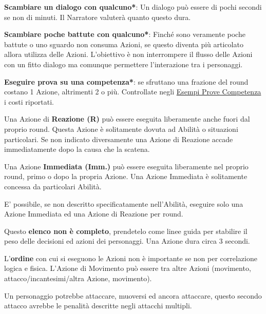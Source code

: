 \begin{multicols}{2}
\textbf{Scambiare un dialogo con qualcuno*}: Un dialogo può essere di pochi secondi se non di minuti. Il Narratore valuterà quanto questo dura.

\textbf{Scambiare poche battute con qualcuno*}: Finché sono veramente poche battute o uno sguardo non consuma Azioni, se questo diventa più articolato allora utilizza delle Azioni. L'obiettivo è non interrompere il flusso delle Azioni con un fitto dialogo ma comunque permettere l'interazione tra i personaggi.

\textbf{Eseguire prova su una competenza*}: se sfruttano una frazione del round costano 1 Azione, altrimenti 2 o più. Controllate negli \hyperlink{esempiprovecompetenze}{Esempi Prove Competenza} i costi riportati.

Una Azione di \textbf{Reazione (R)} può essere eseguita liberamente anche fuori dal proprio round. Questa Azione è solitamente dovuta ad Abilità o situazioni particolari. Se non indicato diversamente una Azione di Reazione accade immediatamente dopo la causa che la scatena.

Una Azione \textbf{Immediata (Imm.)} può essere eseguita liberamente nel proprio round, primo o dopo la propria Azione. Una Azione Immediata è solitamente concessa da particolari Abilità.

E' possibile, se non descritto specificatamente nell'Abilità, eseguire solo una Azione Immediata ed una Azione di Reazione per round.

\smallskip

Questo \textbf{elenco non è completo}, prendetelo come linee guida per stabilire il peso delle decisioni ed azioni dei personaggi. Una Azione dura circa 3 secondi.

L'\textbf{ordine} con cui si eseguono le Azioni non è importante se non per correlazione logica e fisica. L'Azione di Movimento può essere tra altre Azioni (movimento, attacco/incantesimi/altra Azione, movimento).

Un personaggio potrebbe attaccare, muoversi ed ancora attaccare, questo secondo attacco avrebbe le penalità descritte negli attacchi multipli.




\end{multicols}

\vfill


